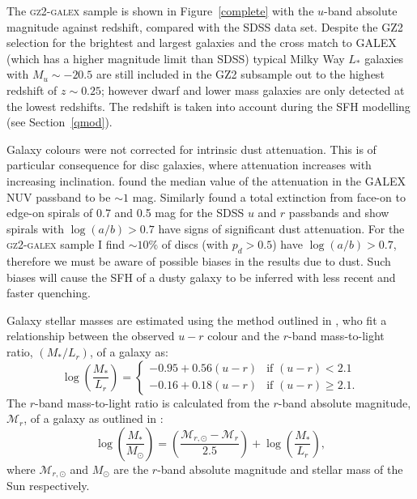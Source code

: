 The \textsc{gz2-galex} sample is shown in Figure~\ref{complete} with the $u$-band absolute magnitude against redshift, compared with the SDSS data set. Despite the GZ2 selection for the brightest and largest galaxies and the cross match to GALEX (which has a higher magnitude limit than SDSS) typical Milky Way $L_*$ galaxies with $M_u \sim -20.5$ are still included in the GZ2 subsample out to the highest redshift of $z \sim 0.25$; however dwarf and lower mass galaxies are only detected at the lowest redshifts. The redshift is taken into account during the SFH modelling (see Section~\ref{qmod}).

Galaxy colours were not corrected for intrinsic dust attenuation. This is of particular consequence for disc galaxies, where attenuation increases with increasing inclination. \cite{Buat05} found the median value of the attenuation in the GALEX NUV passband to be $\sim 1$ mag. Similarly \cite{masters10a} found a total extinction from face-on to edge-on spirals of 0.7 and 0.5 mag for the SDSS $u$ and $r$ passbands and show spirals with $\log(a/b) > 0.7$ have signs of significant dust attenuation. For the \textsc{gz2-galex} sample I find $\sim10\%$ of discs (with $p_d > 0.5$) have $\log(a/b) > 0.7$, therefore we must be aware of possible biases in the results due to dust. Such biases will cause the SFH of a dusty galaxy to be inferred with less recent and faster quenching. 

Galaxy stellar masses are estimated using the method outlined in \cite{Baldry06}, who  fit a relationship between the observed $u-r$ colour and the $r$-band mass-to-light ratio, $(M_*/L_r)$, of a galaxy as:
\begin{equation}\label{baldrymlur}
\log\left(\frac{M_*}{L_r}\right) =
\begin{cases}
-0.95 + 0.56(u-r) & \text{if } (u-r) < 2.1 \\
-0.16 + 0.18(u-r) & \text{if } (u-r) \geq 2.1. 
\end{cases}
\end{equation}
The $r$-band mass-to-light ratio is calculated from the $r$-band absolute magnitude, $\mathcal{M}_r$, of a galaxy as outlined in \cite{blanton01}:
\begin{equation}\label{blanton}
\log\left(\frac{M_*}{M_{\odot}}\right) = \left(\frac{\mathcal{M}_{r,\odot} - \mathcal{M}_r}{2.5}\right) + \log\left(\frac{M_*}{L_r}\right),
\end{equation}
where $\mathcal{M}_{r,\odot}$ and $M_{\odot}$ are the $r$-band absolute magnitude and stellar mass of the Sun respectively. 

